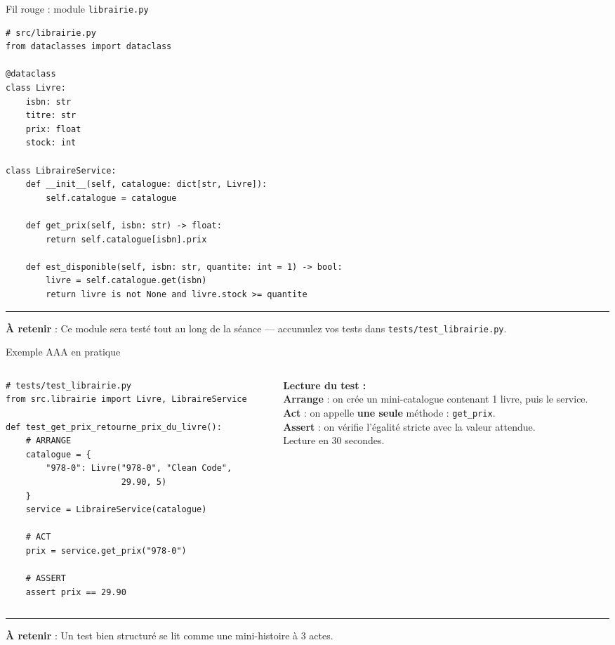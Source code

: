 \documentclass[aspectratio=169,11pt]{beamer}
\newcommand{\takeaway}[1]{%
\vfill\begin{beamercolorbox}[wd=\linewidth,sep=0.4em]{}
\color{accent2}\rule[0.6ex]{1.2em}{1.2pt}\hspace{0.4em}%
\textbf{\color{accent2}\small À retenir} \textcolor{textsoft}{:} %
{\small\color{textmain}#1}
\end{beamercolorbox}}
\begin{document}
\begin{frame}[fragile,t,shrink=20]{Fil rouge : module \texttt{librairie.py}}
\begin{lstlisting}[style=pythondark]
# src/librairie.py
from dataclasses import dataclass

@dataclass
class Livre:
    isbn: str
    titre: str
    prix: float
    stock: int

class LibraireService:
    def __init__(self, catalogue: dict[str, Livre]):
        self.catalogue = catalogue

    def get_prix(self, isbn: str) -> float:
        return self.catalogue[isbn].prix

    def est_disponible(self, isbn: str, quantite: int = 1) -> bool:
        livre = self.catalogue.get(isbn)
        return livre is not None and livre.stock >= quantite
\end{lstlisting}
\takeaway{Ce module sera testé tout au long de la séance --- accumulez vos tests dans \texttt{tests/test\_librairie.py}.}
\end{frame}

\begin{frame}[fragile,t,shrink=25]{Exemple AAA en pratique}
\begin{columns}[T,onlytextwidth]
\begin{column}{0.52\textwidth}
\begin{lstlisting}[style=pythondark]
# tests/test_librairie.py
from src.librairie import Livre, LibraireService

def test_get_prix_retourne_prix_du_livre():
    # ARRANGE
    catalogue = {
        "978-0": Livre("978-0", "Clean Code",
                       29.90, 5)
    }
    service = LibraireService(catalogue)

    # ACT
    prix = service.get_prix("978-0")

    # ASSERT
    assert prix == 29.90
\end{lstlisting}
\end{column}
\begin{column}{0.45\textwidth}
\vspace{0.2cm}\footnotesize
\textbf{Lecture du test :}\\[0.3em]
{\color{accent}\textbf{Arrange}} : on crée un mini-catalogue contenant 1 livre, puis le service.\\[0.5em]
{\color{accent2}\textbf{Act}} : on appelle \textbf{une seule} méthode : \texttt{get\_prix}.\\[0.5em]
{\color{good}\textbf{Assert}} : on vérifie l'égalité stricte avec la valeur attendue.\\[0.8em]
\textcolor{textsoft}{Lecture en 30 secondes.}
\end{column}
\end{columns}
\takeaway{Un test bien structuré se lit comme une mini-histoire à 3 actes.}
\end{frame}
\end{document}
